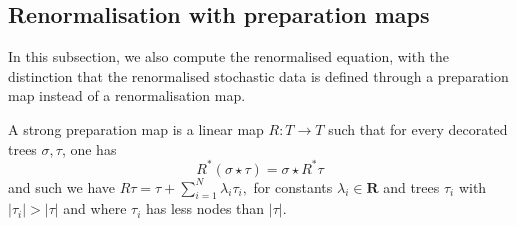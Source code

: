 \documentclass[11pt]{preprint}
\newcommand{\bfR}{\mathbf{R}}
\begin{document}
	
	\subsection{Renormalisation with preparation maps}
	
In this subsection, we also compute the renormalised equation, with the distinction that the renormalised stochastic data is defined through a preparation map instead of a renormalisation map.
	\begin{definition}  \label{def_preparation_map}
		A strong preparation map is a linear map $R:T\to T$ such that for every decorated trees $\sigma, \tau$, one has
		\begin{equation}\label{eq_DeltaRTau}
			R^{*} (\sigma \star \tau) = \sigma \star R^{*} \tau
		\end{equation}
		and such we have 
		$
		R\tau = \tau+ \sum_{i=1}^N \lambda_i\tau_i,
		$
		for constants $\lambda_i\in\bfR$ and trees $\tau_i$ with $|\tau_i|>|\tau|$ and where $\tau_i$ has less nodes than $|\tau|$.
	\end{definition}
\end{document}
